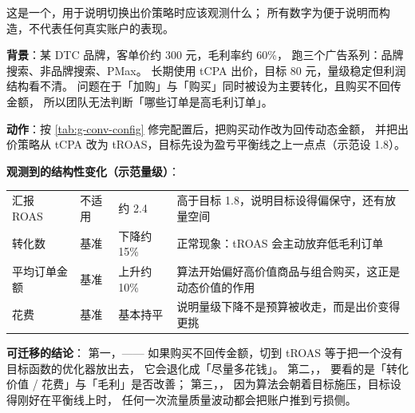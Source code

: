 \begin{casebox}
这是一个，用于说明切换出价策略时应该观测什么；
所有数字为便于说明而构造，不代表任何真实账户的表现。

\textbf{背景}：某 DTC 品牌，客单价约 300 元，毛利率约 60\%，
跑三个广告系列：品牌搜索、非品牌搜索、PMax。
长期使用 tCPA 出价，目标 80 元，量级稳定但利润结构看不清。
问题在于「加购」与「购买」同时被设为主要转化，且购买不回传金额，
所以团队无法判断「哪些订单是高毛利订单」。

\textbf{动作}：按 \cref{tab:g-conv-config} 修完配置后，把购买动作改为回传动态金额，
并把出价策略从 tCPA 改为 tROAS，目标先设为盈亏平衡线之上一点点（示范设 1.8）。

\textbf{观测到的结构性变化（示范量级）}：
\begin{center}
\small
\begin{tabularx}{\linewidth}{L{2.6cm} L{2.4cm} L{2.4cm} Y}
\toprule
{} &  &  &  \\
\midrule
汇报 ROAS & 不适用 & 约 2.4 & 高于目标 1.8，说明目标设得偏保守，还有放量空间 \\
\addlinespace
转化数 & 基准 & 下降约 15\% & 正常现象：tROAS 会主动放弃低毛利订单 \\
\addlinespace
平均订单金额 & 基准 & 上升约 10\% & 算法开始偏好高价值商品与组合购买，这正是动态价值的作用 \\
\addlinespace
花费 & 基准 & 基本持平 & 说明量级下降不是预算被收走，而是出价变得更挑 \\
\bottomrule
\end{tabularx}
\label{tab:g-tcpa-troas}
\end{center}

\textbf{可迁移的结论}：
第一，——
如果购买不回传金额，切到 tROAS 等于把一个没有目标函数的优化器放出去，
它会退化成「尽量多花钱」。
第二，，
要看的是「转化价值 / 花费」与「毛利」是否改善；
第三，，
因为算法会朝着目标施压，目标设得刚好在平衡线上时，
任何一次流量质量波动都会把账户推到亏损侧。
\end{casebox}

